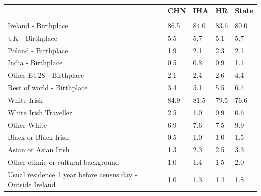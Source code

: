 \documentclass{article}
\begin{document}
\pagebreak
\begin{table}[h]	
\centering
		\begin{tabular}{KTTTT}
  \hline
& \textbf{CHN} & \textbf{IHA} & \textbf{HR}& \textbf{State}\\ 
  \hline
    \\ 
    \hline
Ireland - Birthplace & 86.5& 84.0& 83.6& 80.0\\
UK - Birthplace & 5.5& 5.7& 5.1& 5.7\\
Poland - Birthplace & 1.9& 2.1& 2.3& 2.1\\
India - Birthplace & 0.5& 0.8& 0.9& 1.1\\
Other EU28 - Birthplace & 2.1& 2.4& 2.6& 4.4\\
Rest of world - Birthplace & 3.4& 5.1& 5.5& 6.7\\
    \hline
White Irish & 84.9& 81.5& 79.5& 76.6\\
White Irish Traveller & 2.5& 1.0& 0.9& 0.6\\
Other White & 6.9& 7.6& 7.5& 9.9\\
Black or Black Irish & 0.5& 1.0& 1.0& 1.5\\
Asian or Asian Irish & 1.3& 2.3& 2.5& 3.3\\
Other ethnic or cultural background & 1.0& 1.4& 1.5& 2.0\\
    \hline
Usual residence 1 year before census day - Outside Ireland & 1.0& 1.3& 1.4& 1.8\\


\end{tabular}
\end{table}
\end{document}
